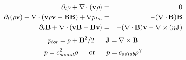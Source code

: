 \begin{eqnarray*}
    \partial_t \rho+\nabla\cdot({\bf v}\rho) &=& 0
\\
   \partial_t(\rho{\bf v})+\nabla\cdot({\bf v}\rho{\bf v}-{\bf B}{\bf B})+\nabla p_{tot}&=& 
        -(\nabla\cdot{\bf B}){\bf B}
\\
   \partial_t {\bf B}+\nabla\cdot({\bf v}{\bf B}-{\bf B}{\bf v})&=&
       -(\nabla\cdot{\bf B}){\bf v}-\nabla\times(\eta{\bf J}) 
\end{eqnarray*}
\null
\begin{displaymath}
  p_{tot}=p+{\bf B}^2/2~~~~~{\bf J}=\nabla\times{\bf B}
\end{displaymath}
\null
\begin{displaymath}
  p=c^2_{sound}\rho~~~~~{\rm or}~~~~~p=c_{adiab}\rho^\gamma
\end{displaymath}
